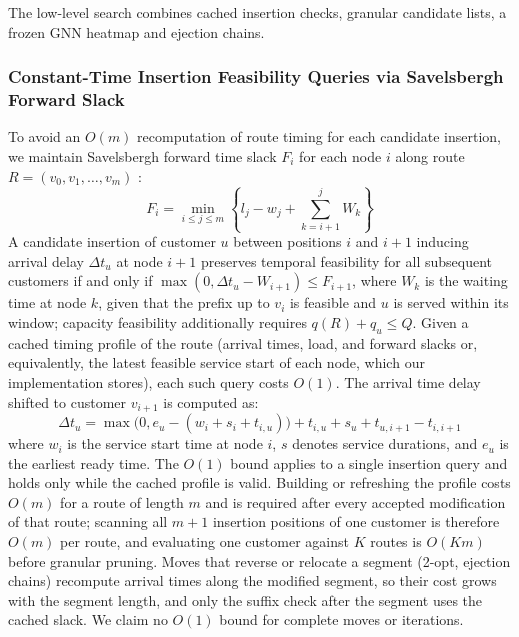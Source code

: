 \documentclass{ieeeaccess}
\begin{document}
The low-level search combines cached insertion checks, granular candidate lists, a frozen GNN heatmap and ejection chains.

\subsubsection{Constant-Time Insertion Feasibility Queries via Savelsbergh Forward Slack}
To avoid an $O(m)$ recomputation of route timing for each candidate insertion, we maintain Savelsbergh forward time slack $F_i$ for each node $i$ along route $R = (v_0, v_1, \dots, v_m)$ \cite{savelsbergh1992general}:
\begin{equation}
  F_i = \min_{i \le j \le m} \left\{ l_j - w_j + \sum_{k=i+1}^{j} W_k \right\}
  \label{eq:forward_slack}
\end{equation}
A candidate insertion of customer $u$ between positions $i$ and $i+1$ inducing arrival delay $\Delta t_u$ at node $i+1$ preserves temporal feasibility for all subsequent customers if and only if $\max(0, \Delta t_u - W_{i+1}) \le F_{i+1}$, where $W_k$ is the waiting time at node $k$, given that the prefix up to $v_i$ is feasible and $u$ is served within its window; capacity feasibility additionally requires $q(R) + q_u \le Q$. Given a cached timing profile of the route (arrival times, load, and forward slacks or, equivalently, the latest feasible service start of each node, which our implementation stores), each such query costs $O(1)$. The arrival time delay shifted to customer $v_{i+1}$ is computed as:
\begin{equation}
  \Delta t_u = \max\bigl(0, e_u - (w_i + s_i + t_{i, u})\bigr) + t_{i, u} + s_u + t_{u, i+1} - t_{i, i+1}
  \label{eq:delta_t_insertion}
\end{equation}
where $w_i$ is the service start time at node $i$, $s$ denotes service durations, and $e_u$ is the earliest ready time. The $O(1)$ bound applies to a single insertion query and holds only while the cached profile is valid. Building or refreshing the profile costs $O(m)$ for a route of length $m$ and is required after every accepted modification of that route; scanning all $m+1$ insertion positions of one customer is therefore $O(m)$ per route, and evaluating one customer against $K$ routes is $O(Km)$ before granular pruning. Moves that reverse or relocate a segment (2-opt, ejection chains) recompute arrival times along the modified segment, so their cost grows with the segment length, and only the suffix check after the segment uses the cached slack. We claim no $O(1)$ bound for complete moves or iterations.
\end{document}
